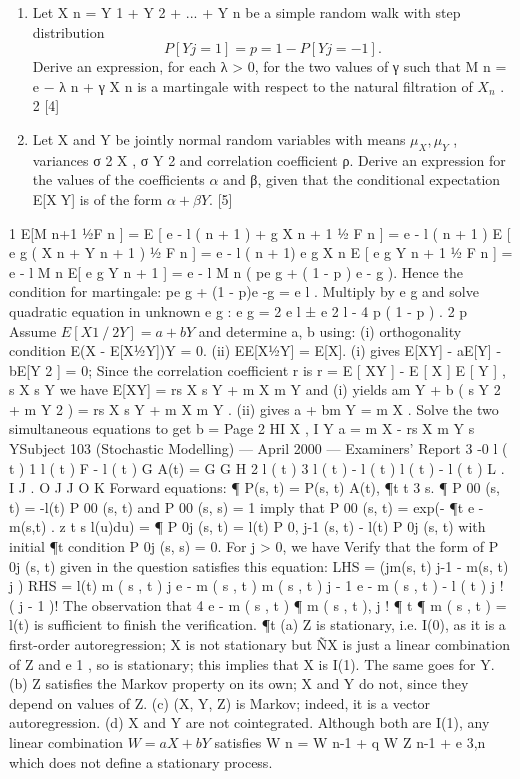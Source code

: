 \documentclass[a4paper,12pt]{article}
\begin{document}
\begin{enumerate}
\item Let X n = Y 1 + Y 2 + ... + Y n be a simple random walk with step distribution
\[P[Y j = 1] = p = 1 − P[Y j = −1].\]
Derive an expression, for each λ > 0, for the two values of γ such that
M n = e − λ n + γ X n is a martingale with respect to the natural filtration of $X_n$ .
2
[4]
\item Let X and Y be jointly normal random variables with means $\mu_X , \mu_Y$ , variances σ 2 X , σ Y 2 and correlation coefficient ρ. Derive an expression for the values of the coefficients $\alpha$ and β, given that the conditional expectation E[XY] is of the
form $\alpha + \beta Y$.
[5]
\end{enumerate}
\newpage

1
E[M n+1 1⁄2F n ] = E [ e - l ( n + 1 ) + g X n + 1 1⁄2 F n ]
= e - l ( n + 1 ) E [ e g ( X n + Y n + 1 ) 1⁄2 F n ] = e - l ( n + 1) e g X n E [ e g Y n + 1 1⁄2 F n ]
= e - l M n E[ e g Y n + 1 ] = e - l M n ( pe g + ( 1 - p ) e - g ).
Hence the condition for martingale:
pe g + (1 - p)e -g = e l .
Multiply by e g and solve quadratic equation in unknown e g :
e g =
2
e l ± e 2 l - 4 p ( 1 - p )
.
2 p
Assume $E[X1⁄2Y] = a + bY$ and determine a, b using:
(i) orthogonality condition E{(X - E[X1⁄2Y])Y} = 0.
(ii) E{E[X1⁄2Y]} = E[X].
(i) gives E[XY] - aE[Y] -bE[Y 2 ] = 0;
Since the correlation coefficient r is
r =
E [ XY ] - E [ X ] E [ Y ]
,
s X s Y
we have E[XY] = rs X s Y + m X m Y and (i) yields
am Y + b ( s Y 2 + m Y 2 ) = rs X s Y + m X m Y .
(ii) gives a + bm Y = m X .
Solve the two simultaneous equations to get
b =
Page 2
HI X
,
I Y
a = m X -
rs X
m Y
s YSubject 103 (Stochastic Modelling) — April 2000 — Examiners’ Report
3
-0
l ( t )
1
l ( t )
F - l ( t )
G
A(t) = G
G
H
2
l ( t )
3
l ( t )
- l ( t )
l ( t )
- l ( t )
L .
I
J
.
O J
J
O K
Forward equations:
¶
P(s, t) = P(s, t) A(t),
¶t
t 3 s.
¶
P 00 (s, t) = -l(t) P 00 (s, t) and P 00 (s, s) = 1 imply that P 00 (s, t) = exp(-
¶t
e -m(s,t) .
z
t
s
l(u)du) =
¶
P 0j (s, t) = l(t) P 0, j-1 (s, t) - l(t) P 0j (s, t) with initial
¶t
condition P 0j (s, s) = 0.
For j > 0, we have
Verify that the form of P 0j (s, t) given in the question satisfies this equation:
LHS = (jm(s, t) j-1 - m(s, t) j )
RHS = l(t)
m ( s , t ) j e - m ( s , t )
m ( s , t ) j - 1 e - m ( s , t )
- l ( t )
j !
( j - 1 )!
The observation that
4
e - m ( s , t ) ¶
m ( s , t ),
j ! ¶ t
¶
m ( s , t ) = l(t) is sufficient to finish the verification.
¶t
(a) Z is stationary, i.e. I(0), as it is a first-order autoregression;
X is not stationary but ÑX is just a linear combination of Z and e 1 , so is stationary; this implies that X is I(1). The same goes for Y.
(b) Z satisfies the Markov property on its own; X and Y do not, since they depend on values of Z.
(c) (X, Y, Z) is Markov; indeed, it is a vector autoregression.
(d) X and Y are not cointegrated. Although both are I(1), any linear
combination $W =aX + bY$ satisfies W n = W n-1 + q W Z n-1 + e 3,n which does not
define a stationary process.
\end{document}
